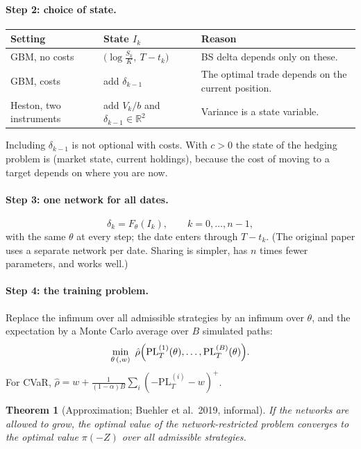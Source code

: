 \documentclass[11pt]{article}
\newtheorem{theorem}{Theorem}[section]
\theoremstyle{definition}
\theoremstyle{remark}
\newcommand{\R}{\mathbb{R}}
\newcommand{\PL}{\mathrm{PL}}
\begin{document}
\paragraph{Step 2: choice of state.}
\begin{center}\small
\renewcommand{\arraystretch}{1.4}
\begin{tabular}{@{}lll@{}}
\toprule
Setting & State $I_k$ & Reason\\
\midrule
GBM, no costs & $\bigl(\log\tfrac{S_k}{K},\ T-t_k\bigr)$ & BS delta depends only on these.\\
GBM, costs & add $\delta_{k-1}$ & The optimal trade depends on the current position.\\
Heston, two instruments & add $V_k/b$ and $\delta_{k-1}\in\R^2$ & Variance is a state variable.\\
\bottomrule
\end{tabular}
\end{center}
Including $\delta_{k-1}$ is not optional with costs. With $c>0$ the state of the hedging problem is
(market state, current holdings), because the cost of moving to a target depends on where you are now.

\paragraph{Step 3: one network for all dates.}
\[
\delta_k=F_\theta(I_k),\qquad k=0,\dots,n-1,
\]
with the same $\theta$ at every step; the date enters through $T-t_k$. (The original paper uses a
separate network per date. Sharing is simpler, has $n$ times fewer parameters, and works well.)

\paragraph{Step 4: the training problem.} Replace the infimum over all admissible strategies by an infimum
over $\theta$, and the expectation by a Monte Carlo average over $B$ simulated paths:
\begin{equation}\label{eq:train}
\min_{\theta\,(,w)}\ \hat\rho\Bigl(\PL_T^{(1)}(\theta),\dots,\PL_T^{(B)}(\theta)\Bigr).
\end{equation}
For CVaR, $\hat\rho=w+\frac{1}{(1-\alpha)B}\sum_i(-\PL^{(i)}_T-w)^+$.

\begin{theorem}[Approximation; Buehler et al.\ 2019, informal]
If the networks are allowed to grow, the optimal value of the network-restricted problem converges to the
optimal value $\pi(-Z)$ over all admissible strategies.
\end{theorem}
\end{document}
